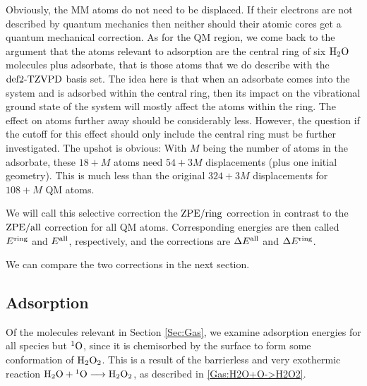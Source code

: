 \documentclass[8.5pt,twoside,twocolumn]{article}
\newcommand\zpe{\enmat{\te{ZPE}}}
\newcommand\ering{\enmat{E^{\te{ring}}}}
\newcommand\eall{\enmat{E^{\te{all}}}}
\newcommand\zpering{\enmat{\zpe/\te{ring}}}
\newcommand\zpeall{\enmat{\zpe/\te{all}}}
\newcommand\singo{\enmat{{^1\te{O}}}}
\theoremstyle{standard}
\begin{document}
Obviously, the MM atoms do not need to be displaced. If their electrons are not
described by quantum mechanics then neither should their atomic cores get a
quantum mechanical correction. As for the QM region, we come back to the argument that
the atoms relevant to adsorption are the central ring of six $\text H _2 \text O$ molecules plus adsorbate,
that is those atoms that we do describe with the $\text{def2-TZVPD}$ basis set. The idea
here is that when an adsorbate comes into the system and is adsorbed within the
central ring, then its impact on the vibrational ground state of the system
will mostly affect the atoms within the ring. The effect on atoms further
away should be considerably less. However, the question if the cutoff for this effect
should only include the central ring must be further investigated. The
upshot is obvious: With $M$ being the number of atoms in the adsorbate, these $18+M$ atoms
need $54+3M$ displacements (plus one initial geometry). This is much less than the
original $324+3M$ displacements for $108+M$ QM atoms.

We will call this selective correction the $\zpering$ correction in contrast to
the $\zpeall$ correction for all QM atoms. Corresponding energies are then called
$\ering$ and $\eall$, respectively, and the corrections are $\Dl\eall$ and $\Dl\ering$. 

We can compare the two corrections in the next section.



\subsection{Adsorption}
\label{Sec:Ads:Adsorption}
\newcommand\avg{\enmat{E_{\te {avg}}}}
Of the molecules relevant in Section \ref{Sec:Gas}, we examine adsorption
energies for all species but $\singo$, since it is chemisorbed by the surface
to form some conformation of $\text H _2 \text O_2$. This is a result of the barrierless
and very exothermic reaction $\hto+\singo\chemar\htot$, as described in
\eqref{Gas:H2O+O->H2O2}.
\end{document}

